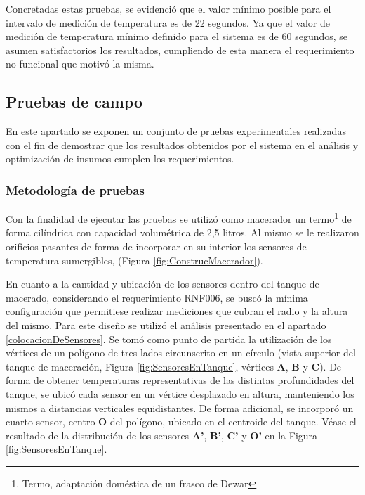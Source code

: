 \par
Concretadas estas pruebas, se evidenció que el valor mínimo posible para el intervalo de medición de temperatura es de 22 segundos. Ya que el valor de medición de temperatura mínimo definido para el sistema es de 60 segundos, se asumen satisfactorios los resultados, cumpliendo de esta manera el requerimiento no funcional que motivó la misma.

\subsection{Pruebas de campo}
\par En este apartado se exponen un conjunto de pruebas experimentales realizadas con el fin de demostrar que los resultados obtenidos por el sistema en el análisis y optimización de insumos cumplen los requerimientos. 

    \subsubsection{Metodología de pruebas}
        \par Con la finalidad de ejecutar las pruebas se utilizó como macerador un termo\footnote{Termo, adaptación doméstica de un frasco de Dewar} de forma cilíndrica con capacidad volumétrica de 2,5 litros. Al mismo se le realizaron orificios pasantes de forma de incorporar en su interior los sensores de temperatura sumergibles, (Figura \ref{fig:ConstrucMacerador}).
        
        \par En cuanto a la cantidad y ubicación de los sensores dentro del tanque de macerado, considerando el requerimiento RNF006, se buscó la mínima configuración que permitiese realizar mediciones que cubran el radio y la altura del mismo. Para este diseño se utilizó el análisis presentado en el apartado \ref{colocacionDeSensores}. Se tomó como punto de partida la utilización de los vértices de un polígono de tres lados circunscrito en un círculo (vista superior del tanque de maceración, Figura \ref{fig:SensoresEnTanque}, vértices \textbf{A}, \textbf{B} y \textbf{C}). De forma de obtener temperaturas representativas de las distintas profundidades del tanque, se ubicó cada sensor en un vértice desplazado en altura, manteniendo los mismos a distancias verticales equidistantes. De forma adicional, se incorporó un cuarto sensor, centro \textbf{O} del polígono, ubicado en el centroide del tanque. Véase el resultado de la distribución de los sensores \textbf{A'}, \textbf{B'}, \textbf{C'} y \textbf{O'} en la Figura \ref{fig:SensoresEnTanque}.

